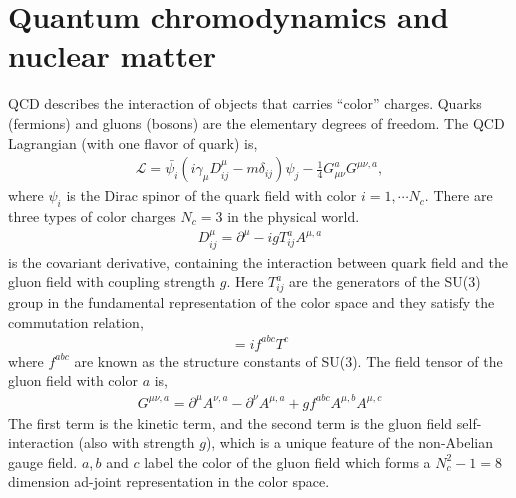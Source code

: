 \section{Quantum chromodynamics and nuclear matter}
QCD describes the interaction of objects that carries ``color'' charges.
Quarks (fermions) and gluons (bosons) are the elementary degrees of freedom. 
The QCD Lagrangian (with one flavor of quark) is,
\begin{eqnarray}
\mathcal{L} = \bar{\psi_i} \left(i\gamma_\mu D^\mu_{ij} -m \delta_{ij} \right)\psi_j - \frac{1}{4}G_{\mu\nu}^a G^{\mu\nu,a},
\end{eqnarray}
where $\psi_i$ is the Dirac spinor of the quark field with color $i=1,\cdots N_c$. 
There are three types of color charges $N_c = 3$ in the physical world.
\begin{eqnarray}
D_{ij}^\mu = \partial^\mu - i g T_{ij}^a A^{\mu, a}
\end{eqnarray}
is the covariant derivative, containing the interaction between quark field and the gluon field with coupling strength $g$.
Here $T_{ij}^a$ are the generators of the SU(3) group in the fundamental representation of the color space and they satisfy the commutation relation,
\begin{eqnarray}
[T^a, T^b] = i f^{abc} T^c
\end{eqnarray}
where $f^{abc}$ are known as the structure constants of SU(3).
The field tensor of the gluon field with color $a$ is,
\begin{eqnarray}
G^{\mu\nu,a} = \partial^\mu A^{\nu, a} - \partial^\nu A^{\mu, a} + g f^{abc} A^{\mu,b}A^{\mu,c}
\end{eqnarray}
The first term is the kinetic term, and the second term is the gluon field self-interaction (also with strength $g$), which is a unique feature of the non-Abelian gauge field.
$a, b$ and $c$ label the color of the gluon field which forms a $N_c^2-1=8$ dimension ad-joint representation in the color space.

